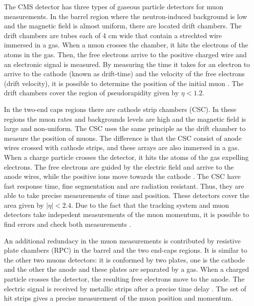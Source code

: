 The CMS detector has three types of gaseous particle detectors for muon measurements. In the barrel region where the neutron-induced background is low and the magnetic field is almost uniform, 
there are located drift chambers. The drift chambers are tubes each of 4 cm wide that contain a strechted wire immersed in a gas. When a muon crosses the chamber, it hits the electrons of the atoms
in the gas. Then, the free electrons arrive to the positive charged wire and an electronic signal is measured. By measuring the time it takes for an electron to arrive to the cathode (known as 
drift-time) and the velocity of the free electrons (drift velocity), it is possible to determine the position of the initial muon \cite{Muon_drift_tubes_cms, Particle_Detectors_Claus}. The drift chambers cover the region of pseudorapidity given by 
$\eta < 1.2$.
  
In the two-end caps regions there are cathode strip chambers (CSC). In these regions the muon rates and backgrounds levels are high and the magnetic field is large and non-uniform. The CSC uses the
same principle as the drift chamber to measure the position of muons. The difference is that the CSC consist of anode wires crossed with cathode strips, and these arrays are also immersed in a gas. When
a charge particle crosses the detector, it hits the atoms of the gas expelling electrons. The free electrons are guided by the electric field and arrive to the anode wires, while the positive ions 
move towards the cathode \cite{CSC_CMS}. The CSC have fast response time, fine segmentation and are radiation resistant. Thus, they are able to take precise measurements of time and position. These detectors cover the
area given by $|\eta| < 2.4$. Due to the fact that the tracking system and muon detectors take indepedent measurements of the muon momentum, it is possible to find errors and check both measurements 
\cite{Perspectives_LHC}.


An additional redundacy in the muon measurements is contributed by resistive plate chambers (RPC) in the barrel and the two end-caps regions. It is similar to the other two muons detectors: it is 
conformed by two plates, one is the cathode and the other the anode and these plates are separated by a gas. When a charged particle crosses the detector, the resulting free electrons move to the anode.
The electric signal is received by metallic strips after a precise time delay \cite{RPC_CMS}. The set of hit strips gives a precise measurement of the muon position and momentum.


